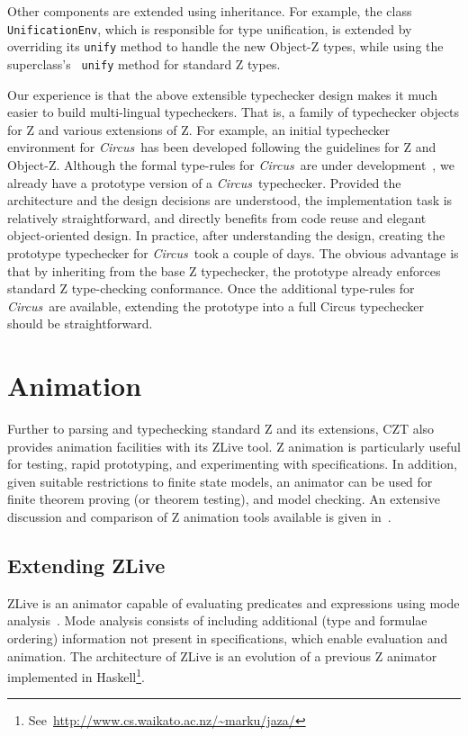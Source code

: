 \documentclass{llncs}
\newcommand{\Circus}{{\sf\slshape Circus}}
\begin{document}
Other components are extended using inheritance.  For example, the
class \texttt{UnificationEnv}, which is responsible for type
unification, is extended by overriding its {\tt unify} method to
handle the new Object-Z types, while using the superclass's {\tt
unify} method for standard Z types.

Our experience is that the above extensible typechecker design makes
it much easier to build multi-lingual typecheckers.  That is, a family
of typechecker objects for Z and various extensions of Z.
%
For example, an initial typechecker environment for \Circus\ has been
developed following the guidelines for Z and Object-Z. Although the
formal type-rules for \Circus\ are under
development~\cite{circus.other:typechecker}, we already have a
prototype version of a \Circus\ typechecker.  Provided the
architecture and the design decisions are understood, the
implementation task is relatively straightforward, and directly
benefits from code reuse and elegant object-oriented design.  In
practice, after understanding the design, creating the prototype
typechecker for \Circus\ took a couple of days. The obvious advantage
is that by inheriting from the base Z typechecker, the prototype already
enforces standard Z type-checking conformance. Once the additional
type-rules for \Circus\ are available, extending the prototype into a full
Circus typechecker should be straightforward.


\section{Animation}\label{animation}

    Further to parsing and typechecking standard Z and its extensions,
    CZT also provides animation facilities with its ZLive tool.  Z
    animation is particularly useful for testing, rapid prototyping,
    and experimenting with specifications.  In addition, given
    suitable restrictions to finite state models, an animator can be
    used for finite theorem proving (or theorem testing), and model
    checking.  An extensive discussion and comparison of Z animation
    tools available is given in~\cite{utting-jaza}.

\subsection{Extending ZLive}

    ZLive is an animator capable of evaluating predicates and
    expressions using mode analysis~\cite{winikooff98}.
    Mode analysis consists of including additional (type and formulae
    ordering) information not present in specifications, which enable
    evaluation and animation.
    The architecture of ZLive is an evolution of a previous Z animator
    implemented in 
    Haskell\footnote{See~\url{http://www.cs.waikato.ac.nz/~marku/jaza/}}.
\end{document}
